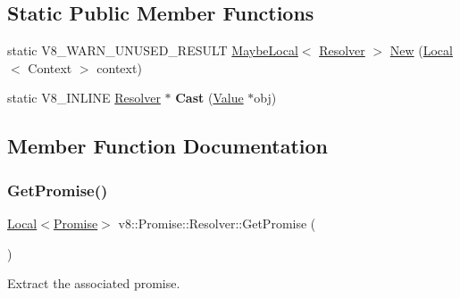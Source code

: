 \subsection*{Static Public Member Functions}
\begin{DoxyCompactItemize}
\item 
static V8\+\_\+\+W\+A\+R\+N\+\_\+\+U\+N\+U\+S\+E\+D\+\_\+\+R\+E\+S\+U\+LT \mbox{\hyperlink{classv8_1_1MaybeLocal}{Maybe\+Local}}$<$ \mbox{\hyperlink{classv8_1_1Promise_1_1Resolver}{Resolver}} $>$ \mbox{\hyperlink{classv8_1_1Promise_1_1Resolver_af2290c10e43fcde230ea7a79b9128b0e}{New}} (\mbox{\hyperlink{classv8_1_1Local}{Local}}$<$ Context $>$ context)
\item 
\mbox{\label{classv8_1_1Promise_1_1Resolver_ab2b541cb210158ed0c757c8b7dc46279}} 
static V8\+\_\+\+I\+N\+L\+I\+NE \mbox{\hyperlink{classv8_1_1Promise_1_1Resolver}{Resolver}} $\ast$ {\bfseries Cast} (\mbox{\hyperlink{classv8_1_1Value}{Value}} $\ast$obj)
\end{DoxyCompactItemize}


\subsection{Member Function Documentation}
\mbox{\label{classv8_1_1Promise_1_1Resolver_a41fd1ffef546a62e363a639935fc8ae3}} 
\subsubsection{\texorpdfstring{Get\+Promise()}{GetPromise()}}
{\footnotesize\ttfamily \mbox{\hyperlink{classv8_1_1Local}{Local}}$<$\mbox{\hyperlink{classv8_1_1Promise}{Promise}}$>$ v8\+::\+Promise\+::\+Resolver\+::\+Get\+Promise (\begin{DoxyParamCaption}{ }\end{DoxyParamCaption})}

Extract the associated promise. \mbox{\label{classv8_1_1Promise_1_1Resolver_af2290c10e43fcde230ea7a79b9128b0e}} 
